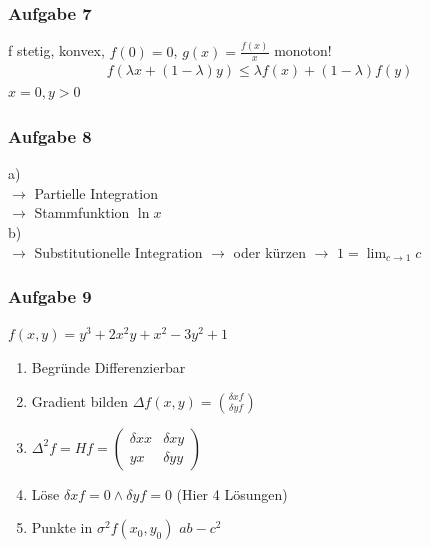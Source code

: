 \subsubsection{Aufgabe 7}
f stetig, konvex, $f(0) = 0$, $g(x) = \frac{f(x)}{x}$ monoton!\\
\begin{align*}
    f(\lambda x + ( 1 - \lambda) y) \leq \lambda f(x) + (1 - \lambda) f(y)
\end{align*}
$x = 0, y > 0$
\subsubsection{Aufgabe 8}
a)\\
$\rightarrow$ Partielle Integration\\
$\rightarrow$ Stammfunktion $\ln x$\\
b)\\
$\rightarrow$ Substitutionelle Integration
$\rightarrow$ oder kürzen
$\rightarrow$ $1 = \lim_{c \rightarrow 1} c$
\subsubsection{Aufgabe 9}
$f(x, y) = y^3 + 2x^2y + x^2 - 3y^2 + 1$
\begin{enumerate}
    \item Begründe Differenzierbar
    \item Gradient bilden $\Delta f(x, y) = \binom{\delta x f}{\delta y f}$
    \item $\Delta^2 f = Hf = \left(\begin{array}{cc}
        \delta xx &  \delta xy \\
        yx & \delta yy
    \end{array}\right)$
    \item Löse $\delta x f= 0 \land \delta y f = 0$
    (Hier 4 Lösungen)
    \item Punkte in $\sigma^2 f(x_0, y_0)$ $ab - c^2$
\end{enumerate}